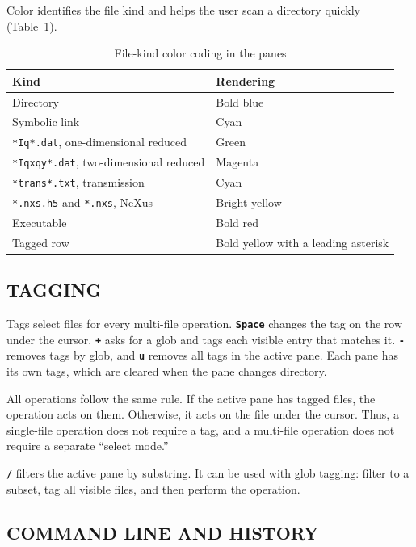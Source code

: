 \documentclass[tm]{ornltm}
\newcommand{\key}[1]{\textbf{\texttt{#1}}}
\begin{document}
Color identifies the file kind and helps the user scan a directory quickly
(Table~\ref{tab:colors}).

\begin{table}[ht]
  \centering
  \caption{File-kind color coding in the panes}
  \label{tab:colors}
  \small
  \begin{tabular}{l l}
    \toprule
    Kind & Rendering \\
    \midrule
    Directory & Bold blue \\
    Symbolic link & Cyan \\
    \texttt{*Iq*.dat}, one-dimensional reduced & Green \\
    \texttt{*Iqxqy*.dat}, two-dimensional reduced & Magenta \\
    \texttt{*trans*.txt}, transmission & Cyan \\
    \texttt{*.nxs.h5} and \texttt{*.nxs}, NeXus & Bright yellow \\
    Executable & Bold red \\
    Tagged row & Bold yellow with a leading asterisk \\
    \bottomrule
  \end{tabular}
\end{table}

\subsection{TAGGING}

Tags select files for every multi-file operation. \key{Space} changes the tag
on the row under the cursor. \key{+} asks for a glob and tags each visible entry
that matches it. \key{-} removes tags by glob, and \key{u} removes all tags in
the active pane. Each pane has its own tags, which are cleared when the pane
changes directory.

All operations follow the same rule. If the active pane has tagged files, the
operation acts on them. Otherwise, it acts on the file under the cursor. Thus, a
single-file operation does not require a tag, and a multi-file operation does
not require a separate ``select mode.''

\key{/} filters the active pane by substring. It can be used with glob tagging:
filter to a subset, tag all visible files, and then perform the operation.

\subsection{COMMAND LINE AND HISTORY}
\end{document}
